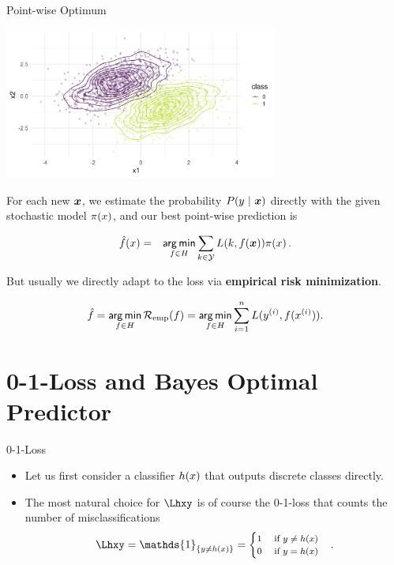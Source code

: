\begin{vbframe}{Point-wise Optimum}
\begin{center}
\includegraphics[width = 9cm ]{figure_man/bayes_error_2.png} \\
\end{center}

For each new $\bm{x}$, we estimate the probability $P(y~|~\bm{x})$ directly with the given stochastic model $\pi(x)$, and our best point-wise prediction is 

\begin{eqnarray*}
  \hat{f}(x) &=& \mathop{\sf arg\,min}_{f \in H} \sum_{k \in \mathcal{Y}} L(k, f(\bm{x})) \pi(x)\,.  \\
\end{eqnarray*}


\lz 

But usually we directly adapt to the loss via \textbf{empirical risk minimization}. 

$$
\hat{f} = \mathop{\sf arg\,min}_{f \in H} \mathcal{R}_{\text{emp}}(f) = \mathop{\sf arg\,min}_{f \in H} \sum_{i=1}^n L(y^{(i)}, f(x^{(i)})).
$$
  

\end{vbframe}

\section{0-1-Loss and Bayes Optimal Predictor}

\begin{vbframe}{0-1-Loss}

\begin{itemize}
  \item Let us first consider a classifier $h(x)$ that outputs discrete classes directly. 
  \item The most natural choice for $\Lhxy$ is of course the 0-1-loss that counts the number of misclassifications
  $$
  \Lhxy = \mathds{1}_{\{y \ne \hx\}} =
     \footnotesize \begin{cases} 1 \quad \text{ if } y \ne \hx \\ 0 \quad    \text{ if } y = \hx  \end{cases}.
  $$

\end{itemize}


\end{vbframe}


